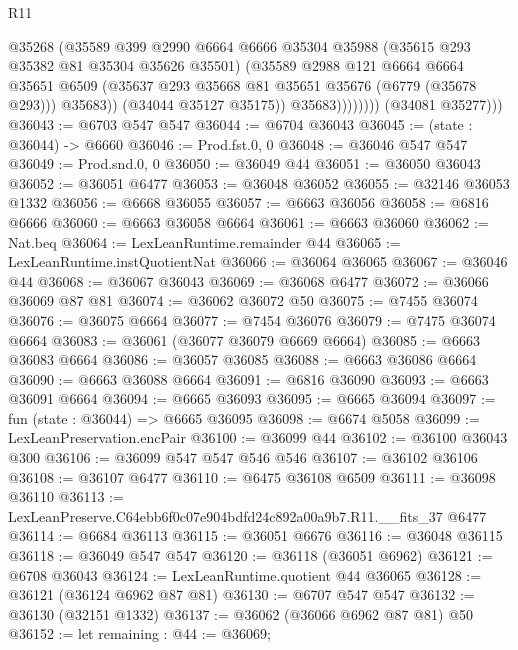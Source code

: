 \begin{lexlean}{R11}
\begin{coremodule}
                          @35268
                          (@35589
                            @399
                            @2990
                            @6664
                            @6666
                            @35304
                            @35988
                            (@35615 @293 @35382 @81 @35304 @35626 @35501)
                            (@35589
                              @2988
                              @121
                              @6664
                              @6664
                              @35651
                              @6509
                              (@35637 @293 @35668 @81 @35651 @35676 (@6779 (@35678 @293)))
                              @35683))
                          (@34044 @35127 @35175))
                        @35683))))))))
        (@34081 @35277)))
@36043 := @6703 @547 @547
@36044 := @6704 @36043
@36045 := (state : @36044) -> @6660
@36046 := Prod.fst.{0, 0}
@36048 := @36046 @547 @547
@36049 := Prod.snd.{0, 0}
@36050 := @36049 @44
@36051 := @36050 @36043
@36052 := @36051 @6477
@36053 := @36048 @36052
@36055 := @32146 @36053 @1332
@36056 := @6668 @36055
@36057 := @6663 @36056
@36058 := @6816 @6666
@36060 := @6663 @36058 @6664
@36061 := @6663 @36060
@36062 := Nat.beq
@36064 := LexLeanRuntime.remainder @44
@36065 := LexLeanRuntime.instQuotientNat
@36066 := @36064 @36065
@36067 := @36046 @44
@36068 := @36067 @36043
@36069 := @36068 @6477
@36072 := @36066 @36069 @87 @81
@36074 := @36062 @36072 @50
@36075 := @7455 @36074
@36076 := @36075 @6664
@36077 := @7454 @36076
@36079 := @7475 @36074 @6664
@36083 := @36061 (@36077 @36079 @6669 @6664)
@36085 := @6663 @36083 @6664
@36086 := @36057 @36085
@36088 := @6663 @36086 @6664
@36090 := @6663 @36088 @6664
@36091 := @6816 @36090
@36093 := @6663 @36091 @6664
@36094 := @6665 @36093
@36095 := @6665 @36094
@36097 := fun (state : @36044) => @6665 @36095
@36098 := @6674 @5058
@36099 := LexLeanPreservation.encPair
@36100 := @36099 @44
@36102 := @36100 @36043 @300
@36106 := @36099 @547 @547 @546 @546
@36107 := @36102 @36106
@36108 := @36107 @6477
@36110 := @6475 @36108 @6509
@36111 := @36098 @36110
@36113 := LexLeanPreserve.C64ebb6f0c07e904bdfd24c892a00a9b7.R11.__fits_37 @6477
@36114 := @6684 @36113
@36115 := @36051 @6676
@36116 := @36048 @36115
@36118 := @36049 @547 @547
@36120 := @36118 (@36051 @6962)
@36121 := @6708 @36043
@36124 := LexLeanRuntime.quotient @44 @36065
@36128 := @36121 (@36124 @6962 @87 @81)
@36130 := @6707 @547 @547
@36132 := @36130 (@32151 @1332)
@36137 := @36062 (@36066 @6962 @87 @81) @50
@36152 := let remaining : @44 := @36069;

\end{coremodule}
\end{lexlean}
